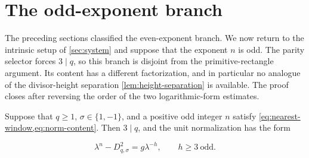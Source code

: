 %
%
\section{The odd-exponent branch}
\label{sec:odd-exponents}

The preceding sections classified the even-exponent branch. We now return to
the intrinsic setup of \cref{sec:system} and suppose that the exponent $n$ is
odd. The parity selector forces $3\mid q$, so this branch is disjoint from
the primitive-rectangle argument. Its content has a different factorization,
and in particular no analogue of the divisor-height separation
\cref{lem:height-separation} is available. The proof closes after reversing
the order of the two logarithmic-form estimates.

\begin{proposition}
\label{prop:odd-negative-exponent}
Suppose that $q\geqslant1$, $\sigma\in\{1,-1\}$, and a positive odd integer
$n$ satisfy \cref{eq:nearest-window,eq:norm-content}. Then $3\mid q$, and
the unit normalization has the form

\begin{equation}
 \lambda^n-D_{q,\sigma}^2=g\lambda^{-h},
 \qquad
 h\geqslant3\ \text{odd}.
 \label{eq:odd-negative-target}
\end{equation}
\end{proposition}

